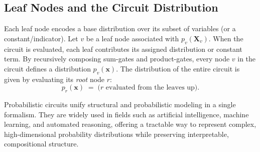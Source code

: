 \subsection{Leaf Nodes and the Circuit Distribution}

Each leaf node encodes a base distribution over its subset of variables (or a constant/indicator). Let \(v\) be a leaf node associated with \(p_v(\mathbf{X}_v)\). When the circuit is evaluated, each leaf contributes its assigned distribution or constant term. By recursively composing sum-gates and product-gates, every node \(v\) in the circuit defines a distribution \(p_v(\mathbf{x})\). The distribution of the entire circuit is given by evaluating its \emph{root} node \(r\):
\[
p_r(\mathbf{x}) \;=\; \text{(\(r\) evaluated from the leaves up)}.
\]

Probabilistic circuits unify structural and probabilistic modeling in a single formalism. They are widely used in fields such as artificial intelligence, machine learning, and automated reasoning, offering a tractable way to represent complex, high-dimensional probability distributions while preserving interpretable, compositional structure.